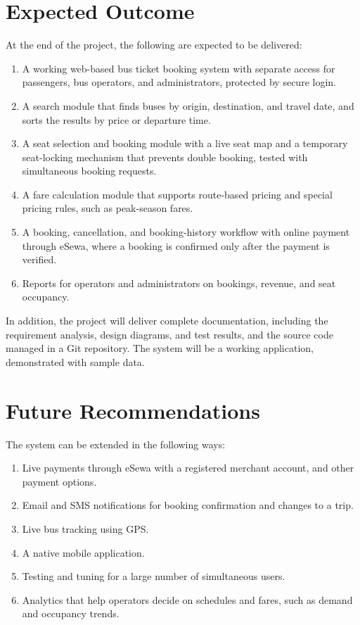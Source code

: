 
\section{Expected Outcome}

At the end of the project, the following are expected to be delivered:
\begin{enumerate}
  \item A working web-based bus ticket booking system with separate access for passengers, bus operators, and administrators, protected by secure login.
  \item A search module that finds buses by origin, destination, and travel date, and sorts the results by price or departure time.
  \item A seat selection and booking module with a live seat map and a temporary seat-locking mechanism that prevents double booking, tested with simultaneous booking requests.
  \item A fare calculation module that supports route-based pricing and special pricing rules, such as peak-season fares.
  \item A booking, cancellation, and booking-history workflow with online payment through eSewa, where a booking is confirmed only after the payment is verified.
  \item Reports for operators and administrators on bookings, revenue, and seat occupancy.
\end{enumerate}

In addition, the project will deliver complete documentation, including the requirement analysis, design diagrams, and test results, and the source code managed in a Git repository. The system will be a working application, demonstrated with sample data.

\section{Future Recommendations}

The system can be extended in the following ways:
\begin{enumerate}
  \item Live payments through eSewa with a registered merchant account, and other payment options.
  \item Email and SMS notifications for booking confirmation and changes to a trip.
  \item Live bus tracking using GPS.
  \item A native mobile application.
  \item Testing and tuning for a large number of simultaneous users.
  \item Analytics that help operators decide on schedules and fares, such as demand and occupancy trends.
\end{enumerate}
